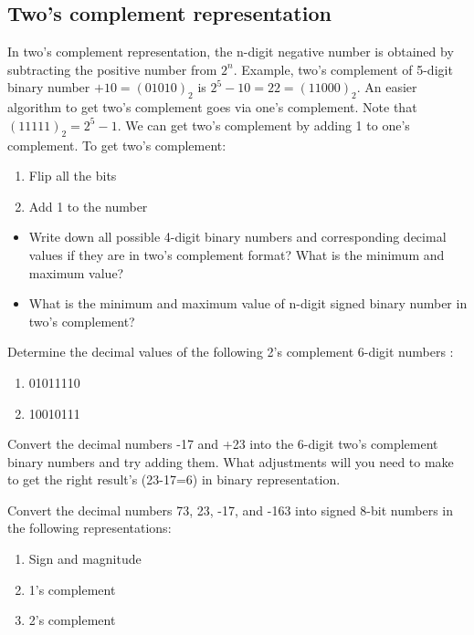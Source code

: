 \subsection{Two's complement representation}

In two's complement representation, the n-digit negative number is obtained by
subtracting the positive number from $2^{n}$. Example, two's
complement of 5-digit binary number $+10 = (01010)_2$ is $2^5 - 10 = 22 =
(11000)_2$. An easier algorithm to get two's complement goes via one's
complement. Note that $(11111)_2 = 2^5-1$. We can get two's complement by adding
1 to one's complement. To get two's complement:
\begin{enumerate}
  \item Flip all the bits
  \item Add 1 to the number
\end{enumerate}

\begin{prob}
  \begin{itemize}
  \item Write down all possible 4-digit binary numbers and corresponding decimal
    values if they are in two's complement format? What is the minimum and maximum value?
  \item What is the minimum and maximum value of n-digit signed binary number in
    two's complement?
  \end{itemize}
\end{prob}
\vspace{20em}

\begin{prob}
  Determine the decimal values of the following 2’s complement 6-digit numbers :
  \begin{enumerate}
  \item 01011110
  \item 10010111
  \end{enumerate}
\end{prob}
\vspace{10em}

\begin{prob}
  Convert the decimal numbers -17 and +23 into the 6-digit two's complement binary numbers and try adding them. What adjustments will you need to make to get the right result's (23-17=6) in binary representation.
\end{prob}
\vspace{10em}

\begin{prob}
  Convert the decimal numbers 73, 23, -17, and -163 into signed 8-bit numbers in the
  following representations:
  \begin{enumerate}
    \item Sign and magnitude
    \item 1’s complement
    \item 2’s complement
  \end{enumerate}
\end{prob}
\vspace{20em}


